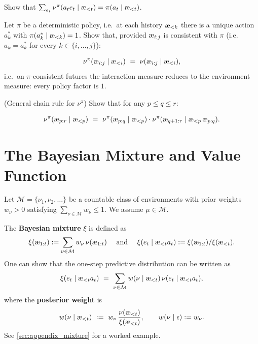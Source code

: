 \documentclass[fontsize=11pt, parskip=half]{scrartcl}
\newcommand{\cM}{\mathcal{M}}
\newcommand{\aes}{\textnormal{\ae}}
\begin{document}
\begin{exercise}
\label{prob:marginal_percepts}
\skippable
Show that $\sum_{e_t} \nu^\pi(a_t e_t \mid \aes_{<t}) = \pi(a_t \mid \aes_{<t})$.

\end{exercise}


\begin{exercise}
\label{prob:det_interaction}
\skippable
Let $\pi$ be a deterministic policy, i.e.\ at each history $\aes_{<k}$ there is a unique action $a^*_k$ with $\pi(a^*_k \mid \aes_{<k}) = 1$.
Show that, provided $\aes_{i:j}$ is consistent with $\pi$ (i.e.\ $a_k = a^*_k$ for every $k \in \{i, \ldots, j\}$):

\[
    \nu^\pi(\aes_{i:j} \mid \aes_{<i}) ~=~ \nu(\aes_{i:j} \mid \aes_{<i}),
\]
i.e.\ on $\pi$-consistent futures the interaction measure reduces to the environment measure: every policy factor is $1$.
\end{exercise}


\begin{exercise}
\label{prob:chain_rule_nupi}
(General chain rule for $\nu^\pi$)
Show that for any $p \leq q \leq r$:

\[
    \nu^\pi(\aes_{p:r} \mid \aes_{<p}) ~=~ \nu^\pi(\aes_{p:q} \mid \aes_{<p}) \cdot \nu^\pi(\aes_{q+1:r} \mid \aes_{<p}\, \aes_{p:q}).
\]
\end{exercise}



\section*{The Bayesian Mixture and Value Function}

\begin{definition}\label{def:mixture}
Let $\cM = \{\nu_1, \nu_2, \ldots\}$ be a countable class of environments with prior weights $w_\nu > 0$ satisfying $\sum_{\nu \in \cM} w_\nu \leq 1$.
We assume $\mu \in \cM$.

The \textbf{Bayesian mixture} $\xi$ is defined as 
$$
\xi(\aes_{1:t}) := \sum_{\nu \in \cM} w_\nu\, \nu(\aes_{1:t}) \quad \text{ and } \quad \xi(e_t \mid \aes_{<t} a_t) := \xi(\aes_{1:t}) / \xi(\aes_{<t}).
$$
One can show that the one-step predictive distribution can be written as
\[
    \xi(e_t \mid \aes_{<t} a_t)
    ~=~ \sum_{\nu \in \cM} w(\nu \mid \aes_{<t})\, \nu(e_t \mid \aes_{<t} a_t),
\]
where the \textbf{posterior weight} is
\[
    w(\nu \mid \aes_{<t})
    ~:=~ w_\nu \,\frac{\nu(\aes_{<t})}{\xi(\aes_{<t})},
    \qquad w(\nu \mid \epsilon) := w_\nu.
\]
See \cref{sec:appendix_mixture} for a worked example.
\end{definition}
\end{document}
